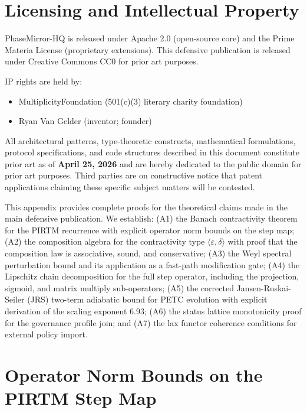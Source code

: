 \documentclass[11pt,letterpaper]{article}
\theoremstyle{remark}
\begin{document}
\section{Licensing and Intellectual Property}

PhaseMirror-HQ is released under Apache 2.0 (open-source core) and the
Prime Materia License (proprietary extensions). This defensive publication
is released under Creative Commons CC0 for prior art purposes.

IP rights are held by:
\begin{itemize}
  \item MultiplicityFoundation (501(c)(3) literary charity foundation)
  \item Ryan Van Gelder (inventor; founder)
\end{itemize}

All architectural patterns, type-theoretic constructs, mathematical
formulations, protocol specifications, and code structures described in
this document constitute prior art as of \textbf{April 25, 2026} and
are hereby dedicated to the public domain for prior art purposes.
Third parties are on constructive notice that patent applications
claiming these specific subject matters will be contested.

\appendix
This appendix provides complete proofs for the theoretical claims made in the
main defensive publication. We establish: (A1) the Banach contractivity theorem
for the PIRTM recurrence with explicit operator norm bounds on the step map;
(A2) the composition algebra for the contractivity type
$\langle\varepsilon,\delta\rangle$ with proof that the composition law is
associative, sound, and conservative; (A3) the Weyl spectral perturbation bound
and its application as a fast-path modification gate; (A4) the Lipschitz chain
decomposition for the full step operator, including the projection, sigmoid, and
matrix multiply sub-operators; (A5) the corrected Jansen-Ruskai-Seiler (JRS)
two-term adiabatic bound for PETC evolution with explicit derivation of the
scaling exponent 6.93; (A6) the status lattice monotonicity proof for the
governance profile join; and (A7) the lax functor coherence conditions for
external policy import.

\section{Operator Norm Bounds on the PIRTM Step Map}
\label{sec:opnorm}
\end{document}

